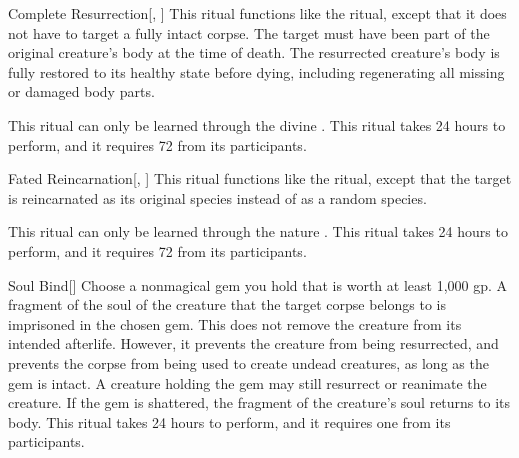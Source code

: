 \lowercase{\hypertarget{spell:Complete Resurrection}{}}\label{spell:Complete Resurrection}
\begin{freeability}[Rank 6]{\hypertarget{spell:Complete Resurrection}{Complete Resurrection}}[, ]
This ritual functions like the  ritual, except that it does not have to target a fully intact corpse.
The target must have been part of the original creature's body at the time of death.
The resurrected creature's body is fully restored to its healthy state before dying, including regenerating all missing or damaged body parts.

This ritual can only be learned through the divine .
This ritual takes 24 hours to perform, and it requires 72  from its participants.
\end{freeability}
\vspace{0.25em}



\lowercase{\hypertarget{spell:Fated Reincarnation}{}}\label{spell:Fated Reincarnation}
\begin{freeability}[Rank 6]{\hypertarget{spell:Fated Reincarnation}{Fated Reincarnation}}[, ]
This ritual functions like the  ritual, except that the target is reincarnated as its original species instead of as a random species.

This ritual can only be learned through the nature .
This ritual takes 24 hours to perform, and it requires 72  from its participants.
\end{freeability}
\vspace{0.25em}



\lowercase{\hypertarget{spell:Soul Bind}{}}\label{spell:Soul Bind}
\begin{freeability}[Rank 6]{\hypertarget{spell:Soul Bind}{Soul Bind}}[]
Choose a nonmagical gem you hold that is worth at least 1,000 gp.
A fragment of the soul of the creature that the target corpse belongs to is imprisoned in the chosen gem.
This does not remove the creature from its intended afterlife.
However, it prevents the creature from being resurrected, and prevents the corpse from being used to create undead creatures, as long as the gem is intact.
A creature holding the gem may still resurrect or reanimate the creature.
If the gem is shattered, the fragment of the creature's soul returns to its body.
This ritual takes 24 hours to perform, and it requires one  from its participants.
\end{freeability}
\vspace{0.25em}



